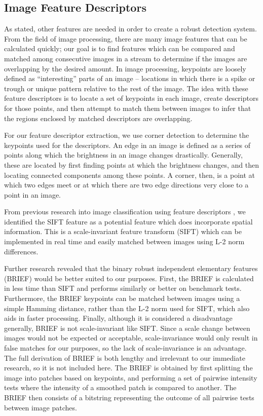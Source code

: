 \subsection{Image Feature Descriptors}

As stated, other features are needed in order to create a robust detection system.
From the field of image processing, there are many image features that can be calculated quickly; our goal is to find features which can be compared and matched among consecutive images in a stream to determine if the images are overlapping by the desired amount.
In image processing, keypoints are loosely defined as ``interesting'' parts of an image -- locations in which there is a spike or trough or unique pattern relative to the rest of the image.
The idea with these feature descriptors is to locate a set of keypoints in each image, create descriptors for those points, and then attempt to match them between images to infer that the regions enclosed by matched descriptors are overlapping.

For our feature descriptor extraction, we use corner detection to determine the keypoints used for the descriptors.
An edge in an image is defined as a series of points along which the brightness in an image changes drastically.
Generally, these are located by first finding points at which the brightness changes, and then locating connected components among these points.
A corner, then, is a point at which two edges meet or at which there are two edge directions very close to a point in an image.


From previous research into image classification using feature descriptors \cite{anomalyhyper}, we identified the SIFT feature as a potential feature which does incorporate spatial information.
This is a scale-invariant feature transform (SIFT) which can be implemented in real time and easily matched between images using L-2 norm differences.


Further research revealed that the binary robust independent elementary features (BRIEF) would be better suited to our purposes.
First, the BRIEF is calculated in less time than SIFT and performs similarly or better on benchmark tests\cite{BRIEF}.
Furthermore, the BRIEF keypoints can be matched between images using a simple Hamming distance, rather than the L-2 norm used for SIFT, which also aids in faster processing.
Finally, although it is considered a disadvantage generally, BRIEF is not scale-invariant like SIFT.
Since a scale change between images would not be expected or acceptable, scale-invariance would only result in false matches for our purposes, so the lack of scale-invariance is an advantage.
The full derivation of BRIEF is both lengthy and irrelevant to our immediate research, so it is not included here.
The BRIEF is obtained by first splitting the image into patches based on keypoints, and performing a set of pairwise intensity tests where the intensity of a smoothed patch is compared to another. 
The BRIEF then consists of a bitstring representing the outcome of all pairwise tests between image patches.

